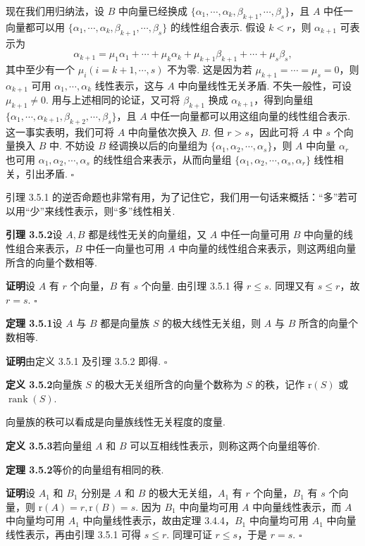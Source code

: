 \documentclass[UTF8,12pt,a4paper,fontset=fandol]{ctexart}
\begin{document}
现在我们用归纳法，设 $B$ 中向量已经换成 $\{\alpha_1,\cdots,\alpha_k,\beta_{k+1},\cdots,\beta_s\}$，且 $A$ 中任一向量都可以用 $\{\alpha_1,\cdots,\alpha_k,\beta_{k+1},\cdots,\beta_s\}$ 的线性组合表示. 假设 $k<r$，则 $\alpha_{k+1}$ 可表示为
\[
\alpha_{k+1}=\mu_1\alpha_1+\cdots+\mu_k\alpha_k+\mu_{k+1}\beta_{k+1}+\cdots+\mu_s\beta_s,
\]
其中至少有一个 $\mu_i(i=k+1,\cdots,s)$ 不为零. 这是因为若 $\mu_{k+1}=\cdots=\mu_s=0$，则 $\alpha_{k+1}$ 可用 $\alpha_1,\cdots,\alpha_k$ 线性表示，这与 $A$ 中向量线性无关矛盾. 不失一般性，可设 $\mu_{k+1}\neq 0$. 用与上述相同的论证，又可将 $\beta_{k+1}$ 换成 $\alpha_{k+1}$，得到向量组 $\{\alpha_1,\cdots,\alpha_{k+1},\beta_{k+2},\cdots,\beta_s\}$，且 $A$ 中任一向量都可以用这组向量的线性组合表示. 这一事实表明，我们可将 $A$ 中向量依次换入 $B$. 但 $r>s$，因此可将 $A$ 中 $s$ 个向量换入 $B$ 中. 不妨设 $B$ 经调换以后的向量组为 $\{\alpha_1,\alpha_2,\cdots,\alpha_s\}$，则 $A$ 中向量 $\alpha_r$ 也可用 $\alpha_1,\alpha_2,\cdots,\alpha_s$ 的线性组合来表示，从而向量组 $\{\alpha_1,\alpha_2,\cdots,\alpha_s,\alpha_r\}$ 线性相关，引出矛盾. $\square$

引理 3.5.1 的逆否命题也非常有用，为了记住它，我们用一句话来概括：“多”若可以用“少”来线性表示，则“多”线性相关.

\noindent\textbf{引理 3.5.2}\quad 设 $A,B$ 都是线性无关的向量组，又 $A$ 中任一向量可用 $B$ 中向量的线性组合来表示，$B$ 中任一向量也可用 $A$ 中向量的线性组合来表示，则这两组向量所含的向量个数相等.

\noindent\textbf{证明}\quad 设 $A$ 有 $r$ 个向量，$B$ 有 $s$ 个向量. 由引理 3.5.1 得 $r\leq s$. 同理又有 $s\leq r$，故 $r=s$. $\square$

\noindent\textbf{定理 3.5.1}\quad 设 $A$ 与 $B$ 都是向量族 $S$ 的极大线性无关组，则 $A$ 与 $B$ 所含的向量个数相等.

\noindent\textbf{证明}\quad 由定义 3.5.1 及引理 3.5.2 即得. $\square$

\noindent\textbf{定义 3.5.2}\quad 向量族 $S$ 的极大无关组所含的向量个数称为 $S$ 的秩，记作 $\mathrm{r}(S)$ 或 $\operatorname{rank}(S)$.

向量族的秩可以看成是向量族线性无关程度的度量.

\noindent\textbf{定义 3.5.3}\quad 若向量组 $A$ 和 $B$ 可以互相线性表示，则称这两个向量组等价.

\noindent\textbf{定理 3.5.2}\quad 等价的向量组有相同的秩.

\noindent\textbf{证明}\quad 设 $A_1$ 和 $B_1$ 分别是 $A$ 和 $B$ 的极大无关组，$A_1$ 有 $r$ 个向量，$B_1$ 有 $s$ 个向量，则 $\mathrm{r}(A)=r,\mathrm{r}(B)=s$. 因为 $B_1$ 中向量均可用 $A$ 中向量线性表示，而 $A$ 中向量均可用 $A_1$ 中向量线性表示，故由定理 3.4.4，$B_1$ 中向量均可用 $A_1$ 中向量线性表示，再由引理 3.5.1 可得 $s\leq r$. 同理可证 $r\leq s$，于是 $r=s$. $\square$
\end{document}
